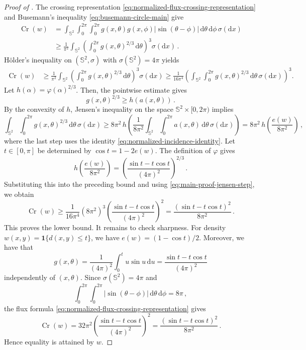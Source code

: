 \documentclass[10pt,a4paper]{amsart}
\newcommand{\II}[1]{\mathbf{1}{#1}}
\newcommand{\abs}[1]{\left\lvert#1\right\rvert}
\newcommand{\dd}{\mathrm{d}}
\begin{document}
\begin{proof}[Proof of ]
The crossing representation \eqref{eq:normalized-flux-crossing-representation} and Busemann's inequality \eqref{eq:busemann-circle-main} give
\begin{align*}
    \operatorname{Cr}(w)&=\int_{{\mathbb S}^2}\int_0^{2\pi}\int_0^{2\pi}
        g(x,\theta)g(x,\phi)\abs{\sin(\theta-\phi)}
        \,\dd\theta\,\dd\phi\,\sigma(\dd x) \\
        &\geq  \frac1{\pi^2}\int_{{\mathbb S}^2} 
        \left(\int_0^{2\pi}g(x,\theta)^{2/3}\,\dd\theta\right)^3 \sigma(\dd x)\,.
\end{align*}
H\"older's inequality on \(({\mathbb S}^2,\sigma)\) with \(\sigma({\mathbb S}^2)=4\pi\) yields
\begin{align*}
    \operatorname{Cr}(w)&\geq  \frac1{\pi^2}\int_{{\mathbb S}^2} \left(\int_0^{2\pi}g(x,\theta)^{2/3}\,\dd\theta\right)^3 \sigma(\dd x) \geq \frac1{16\pi^4}\left(\int_{{\mathbb S}^2} \int_0^{2\pi}g(x,\theta)^{2/3}\,\dd\theta \,\sigma(\dd x) \right)^3.
\end{align*}
Let $h(\alpha) = \varphi(\alpha)^{2/3}$. Then, the pointwise estimate  gives 
\[
        g(x,\theta)^{2/3}\ge h(a(x,\theta))\,.
\]
By the convexity of \(h\), Jensen's inequality on the space
\({\mathbb S}^2\times[0,2\pi)\) implies
\begin{equation}\label{eq:main-proof-jensen-step}   \int_{{\mathbb S}^2}\int_0^{2\pi}g(x,\theta)^{2/3}\,\dd\theta\,\sigma(\dd x)
        \ge
        8\pi^2\,
        h\left(
        \frac1{8\pi^2}
        \int_{{\mathbb S}^2}\int_0^{2\pi}a(x,\theta)\,\dd\theta\,\sigma(\dd x)
        \right)  =8\pi^2\,h\left(\frac{e(w)}{8\pi^2}\right)\,,
\end{equation}
where the last step uses the identity \eqref{eq:normalized-incidence-identity}.
Let \(t\in[0,\pi]\) be determined by \(\cos t=1-2e(w)\).  The definition of \(\varphi\) gives
\[
        h\left(\frac{e(w)}{8\pi^2}\right)
        =
        \left(\frac{\sin t-t\cos t}{(4\pi)^2}\right)^{2/3}\,.
\]
Substituting this into the preceding bound and using \eqref{eq:main-proof-jensen-step}, we obtain
\[
        \operatorname{Cr}(w)
        \ge
        \frac1{16\pi^4}
        (8\pi^2)^3
        \left(\frac{\sin t-t\cos t}{(4\pi)^2}\right)^2
        =
        \frac{(\sin t-t\cos t)^2}{8\pi^2}\,.
\]
This proves the lower bound. It remains to check sharpness.  For density \(w(x,y)=\II{\{d(x,y)\le t\}}\), we have \(e(w)=(1-\cos t)/2\).  Moreover, we have that
\[
        g(x,\theta)
        =
        \frac1{(4\pi)^2}\int_0^t u\sin u\,\dd u
        =
        \frac{\sin t-t\cos t}{(4\pi)^2}
\]
independently of \((x,\theta)\).  Since $\sigma({\mathbb S}^2)=4\pi$ and 
\[
        \int_0^{2\pi}\int_0^{2\pi}\abs{\sin(\theta-\phi)}\,\dd\theta\,\dd\phi=8\pi\,,
\]
the flux formula \eqref{eq:normalized-flux-crossing-representation} gives
\[
        \operatorname{Cr}(w)
        =32\pi^2
        \left(\frac{\sin t-t\cos t}{(4\pi)^2}\right)^2
        =
        \frac{(\sin t-t\cos t)^2}{8\pi^2}\,.
\]
Hence equality is attained by \(w\).
\end{proof}
\end{document}
